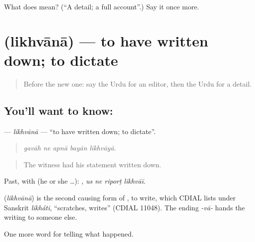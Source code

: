 \begin{tcolorbox}[breakable,colback=teal!4,colframe=teal!35!black,title={Before you move on}]
What does  mean? (\textquotedblleft{}A detail; a full account\textquotedblright{}.) Say it once more.
\end{tcolorbox}
\section[\texorpdfstring{\ur{لکھوانا} (likhvānā)}{لکھوانا (likhvānā)}]{ (likhvānā) — to have written down; to dictate}

\label{lesson:UR-C301-likhvana}



\begin{quote}
Before the new one: say the Urdu for an editor, then the Urdu for a detail.
\end{quote}

\subsection*{You'll want to know: }
\textbf{} — \emph{likhvānā} — \textquotedblleft{}to have written down; to dictate\textquotedblright{}.

\begin{quote}
    
\end{quote}

\begin{quote}
\emph{gavāh ne apnā bayān likhvāyā.}
\end{quote}

\begin{quote}
The witness had his statement written down.
\end{quote}

Past, with  (he or she …):    , \emph{us ne riporṭ likhvāī}.

\begin{cousinweb}
\textbf{} (\emph{likhvānā}) is the second causing form of \textbf{}, to write, which CDIAL lists under Sanskrit \emph{likháti}, \textquotedblleft{}scratches, writes\textquotedblright{} (CDIAL 11048). The ending \emph{-vā-} hands the writing to someone else.
\end{cousinweb}

\begin{grammarlens}[title={What you've built}]
One more word for telling what happened.
\end{grammarlens}

